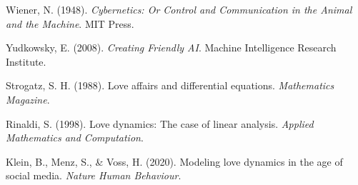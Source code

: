 \documentclass[a4paper]{article}
\begin{document}
Wiener, N. (1948). \textit{Cybernetics: Or Control and Communication in the Animal and the Machine}. MIT Press.

Yudkowsky, E. (2008). \textit{Creating Friendly AI}. Machine Intelligence Research Institute.

Strogatz, S. H. (1988). Love affairs and differential equations. \textit{Mathematics Magazine}.

Rinaldi, S. (1998). Love dynamics: The case of linear analysis. \textit{Applied Mathematics and Computation}.

Klein, B., Menz, S., \& Voss, H. (2020). Modeling love dynamics in the age of social media. \textit{Nature Human
Behaviour}.


\bigskip
\end{document}
